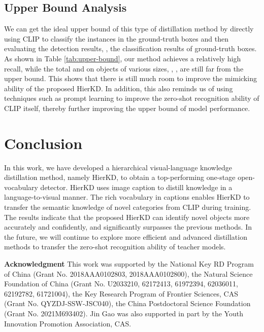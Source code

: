 \documentclass[10pt,twocolumn,letterpaper]{article}
\begin{document}
\subsection{Upper Bound Analysis}
We can get the ideal upper bound of this type of distillation method by directly using CLIP to classify the instances in the ground-truth boxes and then evaluating the detection results, \ie, the classification results of ground-truth boxes. As shown in Table \ref{tab:upper-bound}, our method achieves a relatively high recall, while the total  and  on objects of various sizes, \ie , ,  are still far from the upper bound. This shows that there is still much room to improve the mimicking ability of the proposed HierKD. In addition, this also reminds us of using techniques such as prompt learning \cite{zhou2021coop} to improve the zero-shot recognition ability of CLIP itself, thereby further improving the upper bound of model performance.
\vspace{-0.6em}

\section{Conclusion}
In this work, we have developed a hierarchical visual-language knowledge distillation method,  namely HierKD, to obtain a top-performing one-stage open-vocabulary detector. HierKD uses image caption to distill knowledge in a language-to-visual manner. The rich vocabulary in captions enables HierKD to transfer the semantic knowledge of novel categories from CLIP during training. The results indicate that the proposed HierKD can identify novel objects more accurately and confidently, and significantly surpasses the previous methods. In the future, 
we will continue to explore more efficient and advanced distillation methods to transfer the zero-shot recognition ability of teacher models.


\noindent \textbf{Acknowledgment} This work was supported by the National Key RD Program of China (Grant No. 2018AAA0102803, 2018AAA0102800), the Natural Science Foundation of China (Grant No. U2033210, 62172413, 61972394, 62036011, 62192782, 61721004), the Key Research Program of Frontier Sciences, CAS (Grant No. QYZDJ-SSW-JSC040), the China Postdoctoral Science Foundation (Grant No. 2021M693402). Jin Gao was also supported in part by the Youth Innovation Promotion Association, CAS.


{\small


}
\end{document}
